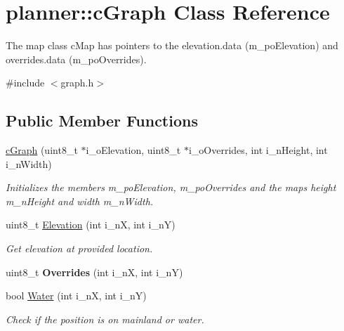 \hypertarget{classplanner_1_1c_graph}{}\section{planner\+:\+:c\+Graph Class Reference}
\label{classplanner_1_1c_graph}


The map class c\+Map has pointers to the elevation.\+data (m\+\_\+po\+Elevation) and overrides.\+data (m\+\_\+po\+Overrides).  




{\ttfamily \#include $<$graph.\+h$>$}

\subsection*{Public Member Functions}
\begin{DoxyCompactItemize}
\item 
\mbox{\label{classplanner_1_1c_graph_a189aeb64fe91fd6dd07f4b068d3b791e}} 
\mbox{\hyperlink{classplanner_1_1c_graph_a189aeb64fe91fd6dd07f4b068d3b791e}{c\+Graph}} (uint8\+\_\+t $\ast$i\+\_\+o\+Elevation, uint8\+\_\+t $\ast$i\+\_\+o\+Overrides, int i\+\_\+n\+Height, int i\+\_\+n\+Width)
\begin{DoxyCompactList}\small\item\em Initializes the members m\+\_\+po\+Elevation, m\+\_\+po\+Overrides and the maps height m\+\_\+n\+Height and width m\+\_\+n\+Width. \end{DoxyCompactList}\item 
uint8\+\_\+t \mbox{\hyperlink{classplanner_1_1c_graph_a0e01eaa240f5e4f5020df2d611ab1994}{Elevation}} (int i\+\_\+nX, int i\+\_\+nY)
\begin{DoxyCompactList}\small\item\em Get elevation at provided location. \end{DoxyCompactList}\item 
\mbox{\label{classplanner_1_1c_graph_adf0a3350d15819b92ec14c4596ebf702}} 
uint8\+\_\+t {\bfseries Overrides} (int i\+\_\+nX, int i\+\_\+nY)
\item 
bool \mbox{\hyperlink{classplanner_1_1c_graph_a97108b0e05fa547c006d76e749d52f27}{Water}} (int i\+\_\+nX, int i\+\_\+nY)
\begin{DoxyCompactList}\small\item\em Check if the position is on mainland or water. \end{DoxyCompactList}\item 

\end{DoxyCompactItemize}
